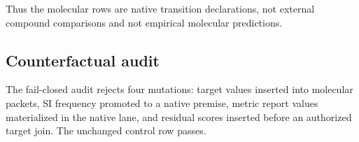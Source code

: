 Thus the molecular rows are native transition declarations, not external compound comparisons and not empirical molecular predictions.

\subsection{Counterfactual audit}

The fail-closed audit rejects four mutations: target values inserted into molecular packets, SI frequency promoted to a native premise, metric report values materialized in the native lane, and residual scores inserted before an authorized target join. The unchanged control row passes.

